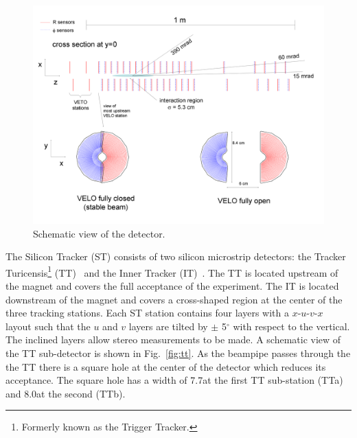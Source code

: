 \begin{figure}[!htb]
\centering
\includegraphics[width=\textwidth]{figs/detector/velo.png}
\caption{Schematic view of the \velo detector.}
\label{fig:velo}
\end{figure}

The Silicon Tracker (ST) consists of two silicon microstrip detectors: the Tracker Turicensis\footnote{Formerly known as the Trigger Tracker.} (TT)~\cite{lhcb-tdr} and the Inner Tracker (IT)~\cite{it-tdr}. The TT is located upstream of the magnet and covers the full acceptance of the experiment. The IT is located downstream of the magnet and covers a cross-shaped region at the center of the three tracking stations. Each ST station contains four layers with a \mbox{$x$-$u$-$v$-$x$} layout such that the $u$ and $v$ layers are tilted by $\pm$ 5$^{\circ}$ with respect to the vertical. The inclined layers allow stereo measurements to be made. A schematic view of the TT sub-detector is shown in Fig.~\ref{fig:tt}. As the beampipe passes through the the TT there is a square hole at the center of the detector which reduces its acceptance. The square hole has a width of 7.7\cm at the first TT sub-station (TTa) and 8.0\cm at the second (TTb).

